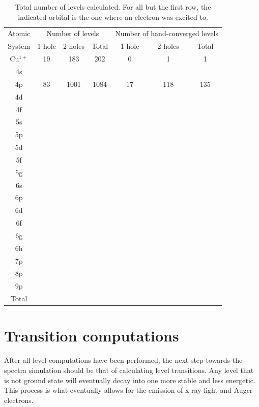 \begin{table}[h!]
    \centering
    \caption{Total number of levels calculated. For all but the first row, the indicated orbital is the one where an electron was excited to.}
    \label{tab:tot_levels}
    \begin{tabular}{c||c|c|c||c|c|c}
        \toprule Atomic&\multicolumn{3}{c||}{Number of levels}&\multicolumn{3}{c}{Number of hand-converged levels}\\
        System&1-hole&2-holes&Total&1-hole&2-holes&Total\\
        \midrule
        Cu$^{1+}$ & 19 &183&202&0&1&1\\ 
        4s\\
        4p & 83 &1001 &1084&17&118&135\\
        4d\\
        4f\\
        5s\\
        5p\\
        5d\\
        5f\\
        5g\\
        6s\\
        6p\\
        6d\\
        6f\\
        6g\\
        6h\\
        7p\\
        8p\\
        9p\\
        \midrule
        Total\\
        \bottomrule
    \end{tabular}
\end{table}



\section{Transition computations}

After all level computations have been performed, the next step towards the spectra simulation should be that of calculating level transitions. Any level that is not ground state will eventually decay into one more stable and less energetic. This process is what eventually allows for the emission of x-ray light and Auger electrons.

